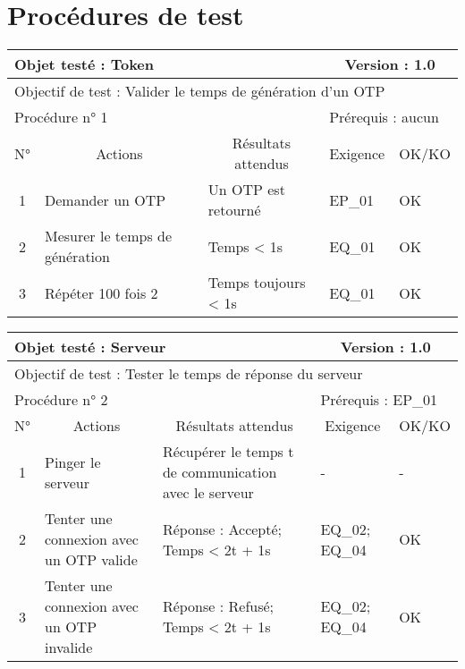 \documentclass{"../../res/univ-projet"}
\begin{document}
  \section{Procédures de test}  
  \begin{center}
    
    \begin{tabular}{|c|p{5cm}|p{5cm}|p{1.5cm}|p{1.5cm}|}
      \hline
      \multicolumn{3}{|l|}{Objet testé : Token} & \multicolumn{2}{c|}{Version : 1.0}\\ \hline
      \multicolumn{5}{|l|}{Objectif de test : Valider le temps de génération d'un OTP}\\ \hline
      \multicolumn{3}{|l|}{Procédure n° 1} & \multicolumn{2}{p{3cm}|}{Prérequis : aucun}\\ \hline
      \multicolumn{1}{|c|}{N°} & \multicolumn{1}{c|}{Actions} & \multicolumn{1}{c|}{Résultats attendus} & 
      \multicolumn{1}{c|}{Exigence} & \multicolumn{1}{c|}{OK/KO}\\ \hline
      1 & Demander un OTP & Un OTP est retourné & EP\_01 & OK\\
      2 & Mesurer le temps de génération & Temps < 1s & EQ\_01 & OK\\
      3 & Répéter 100 fois 2 & Temps toujours < 1s & EQ\_01 & OK\\ \hline
    \end{tabular}
    \newline
    
    \begin{tabular}{|c|p{5cm}|p{5cm}|p{1.5cm}|p{1.5cm}|}
      \hline
      \multicolumn{3}{|l|}{Objet testé : Serveur} & \multicolumn{2}{c|}{Version : 1.0}\\ \hline
      \multicolumn{5}{|l|}{Objectif de test : Tester le temps de réponse du serveur}\\ \hline
      \multicolumn{3}{|l|}{Procédure n° 2} & \multicolumn{2}{p{3cm}|}{Prérequis : EP\_01}\\ \hline
      \multicolumn{1}{|c|}{N°} & \multicolumn{1}{c|}{Actions} & \multicolumn{1}{c|}{Résultats attendus} & 
      \multicolumn{1}{c|}{Exigence} & \multicolumn{1}{c|}{OK/KO}\\ \hline
      1 & Pinger le serveur & Récupérer le temps t de communication avec le serveur & - & - \\
      2 & Tenter une connexion avec un OTP valide & Réponse : Accepté; Temps < 2t + 1s & EQ\_02; EQ\_04 &  OK \\
      3 & Tenter une connexion avec un OTP invalide & Réponse : Refusé; Temps < 2t + 1s & EQ\_02; EQ\_04 & OK\\ \hline
    \end{tabular}
    

\end{center}
\end{document}
